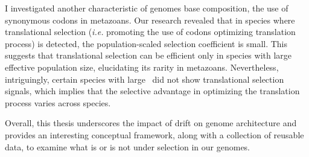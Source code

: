 I investigated another characteristic of genomes base composition, the use of synonymous codons in metazoans. Our research revealed that in species where translational selection (\textit{i.e.} promoting the use of codons optimizing translation process) is detected, the population-scaled selection coefficient is small. This suggests that translational selection can be efficient only in species with large effective population size, elucidating its rarity in metazoans. Nevertheless, intriguingly, certain species with large \Ne~did not show translational selection signals, which implies that the selective advantage in optimizing the translation process varies across species.

Overall, this thesis underscores the impact of drift on genome architecture and provides an interesting conceptual framework, along with a collection of reusable data, to examine what is or is not under selection in our genomes.
